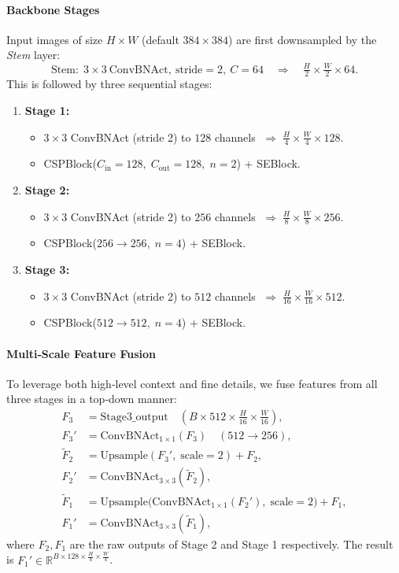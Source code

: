 \paragraph{Backbone Stages}
Input images of size $H\times W$ (default $384\times384$) are first downsampled by the \emph{Stem} layer:
\[
  \text{Stem} :\; 3\times3\ \text{ConvBNAct},\ \text{stride}=2,\ C=64
\quad\Longrightarrow\quad \tfrac{H}{2}\times\tfrac{W}{2}\times64.
\]
This is followed by three sequential stages:
\begin{enumerate}
  \item \textbf{Stage 1:}
    \begin{itemize}
      \item $3\times3$ ConvBNAct (stride 2) to $128$ channels $\;\Rightarrow\;\tfrac{H}{4}\times\tfrac{W}{4}\times128$.
      \item CSPBlock($C_{\mathrm{in}}=128,\;C_{\mathrm{out}}=128,\;n=2$) + SEBlock.
    \end{itemize}
  \item \textbf{Stage 2:}
    \begin{itemize}
      \item $3\times3$ ConvBNAct (stride 2) to $256$ channels $\;\Rightarrow\;\tfrac{H}{8}\times\tfrac{W}{8}\times256$.
      \item CSPBlock($256\!\to\!256,\;n=4$) + SEBlock.
    \end{itemize}
  \item \textbf{Stage 3:}
    \begin{itemize}
      \item $3\times3$ ConvBNAct (stride 2) to $512$ channels $\;\Rightarrow\;\tfrac{H}{16}\times\tfrac{W}{16}\times512$.
      \item CSPBlock($512\!\to\!512,\;n=4$) + SEBlock.
    \end{itemize}
\end{enumerate}

\paragraph{Multi‐Scale Feature Fusion}
To leverage both high‐level context and fine details, we fuse features from all three stages in a top‐down manner:
\[
\begin{aligned}
  F_3 &= \text{Stage3\_output}\quad (B\times512\times\tfrac{H}{16}\times\tfrac{W}{16}),\\
  F_3' &= \mathrm{ConvBNAct}_{1\times1}(F_3)\quad(512\!\to\!256),\\
  \widetilde F_2 &= \mathrm{Upsample}(F_3',\; \text{scale}=2) + F_2,\\
  F_2' &= \mathrm{ConvBNAct}_{3\times3}(\widetilde F_2),\\
  \widetilde F_1 &= \mathrm{Upsample}\bigl(\mathrm{ConvBNAct}_{1\times1}(F_2'),\; \text{scale}=2\bigr) + F_1,\\
  F_1' &= \mathrm{ConvBNAct}_{3\times3}(\widetilde F_1),
\end{aligned}
\]
where $F_2,F_1$ are the raw outputs of Stage 2 and Stage 1 respectively.  The result is $F_1'\in\mathbb{R}^{B\times128\times\frac{H}{4}\times\frac{W}{4}}$.

